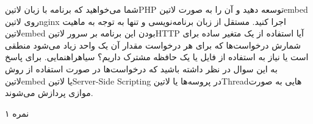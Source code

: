 \documentclass[../main.tex]{subfiles}
\begin{document}

شما می‌خواهید که برنامه با زبان ‌لاتین{PHP} توسعه دهید و آن را به صورت ‌لاتین{embed} روی ‌لاتین{nginx} اجرا کنید.
مستقل از زبان برنامه‌نویسی و تنها به توجه به ماهیت ‌لاتین{embed} بودن این برنامه بر سرور ‌لاتین{HTTP} آیا استفاده از یک متغیر ساده برای شمارش درخواست‌ها
که برای هر درخواست مقدار آن یک واحد زیاد می‌شود منطقی است یا نیاز به استفاده از فایل یا یک حافظه مشترک داریم؟
‌سیاه{راهنمایی.} برای پاسخ به این سوال در نظر داشته باشید که درخواست‌ها در صورت استفاده از روش ‌لاتین{embed} یا ‌لاتین{Server-Side Scripting}
در پروسه‌ها یا ‌لاتین{Thread}هایی به صورت موازی پردازش می‌شوند.

۱ نمره
\end{document}
